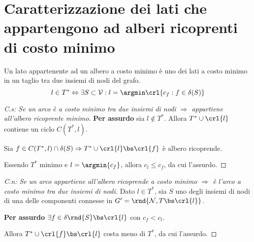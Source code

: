 \documentclass[\main/main.tex]{subfiles}
\begin{document}
\section{Caratterizzazione dei lati che appartengono ad alberi ricoprenti di costo minimo}

\begin{theorem}
  Un lato appartenente ad un albero a costo minimo è uno dei lati a costo minimo in un taglio tra due insiemi di nodi del grafo.
  \[
    l \in T^* \Leftrightarrow \exists S \subset \mathcal{V}: l = \argmin \crl{c_f: f \in \delta(S)}
  \]
\end{theorem}

\begin{proof}[C.s: Se un arco è a costo minimo tra due insiemi di nodi $\Rightarrow$ appartiene all'albero ricoprente minimo]
  \textbf{Per assurdo} sia $l \not\in T^*$. Allora $T^* \cup \crl{l}$ contiene un ciclo $C(T^*, l)$.

  Sia $f \in C(T^*, l) \cap \delta(S) \Rightarrow T^* \cup \crl{l} \bs \crl{f}$ è albero ricoprende.

  Essendo $T^*$ minimo e $l = \argmin{c_f}$, allora $c_l \leq c_f$, da cui l'assurdo.
\end{proof}

\begin{proof}[C.n: Se un arco appartiene all'albero ricoprende a costo minimo $\Rightarrow$ è l'arco a costo minimo tra due insiemi di nodi]
  Dato $l \in T^*$, sia $S$ uno degli insiemi di nodi di una delle componenti connesse in $G' = \rnd{\mathcal{N}, T \bs \crl{l}}$.

  \textbf{Per assurdo} $\exists f \in \delta\rnd{S}\bs \crl{l}$ con $c_f < c_l$.

  Allora $T^*\cup \crl{f} \bs \crl{l}$ costa meno di $T^*$, da cui l'assurdo.
\end{proof}
\end{document}
